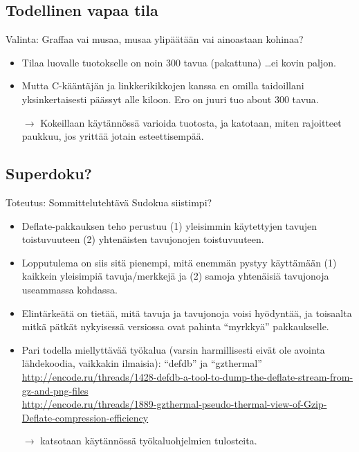 \documentclass[pdf,10pt,handout]{beamer}
\begin{document}
\subsection{Todellinen vapaa tila}
\begin{frame}{Valinta: Graffaa vai musaa, musaa ylipäätään vai ainoastaan kohinaa?}
  \begin{itemize}
  \item Tilaa luovalle tuotokselle on noin 300 tavua (pakattuna)
    \ldots ei kovin paljon.
  \item Mutta C-kääntäjän ja linkkerikikkojen kanssa en omilla
    taidoillani yksinkertaisesti päässyt alle kiloon. Ero on juuri tuo
    about 300 tavua.
    \item[$\rightarrow$] Kokeillaan käytännössä varioida tuotosta, ja
      katotaan, miten rajoitteet paukkuu, jos yrittää jotain
      esteettisempää.
  \end{itemize}
\end{frame}


\subsection{Superdoku?}
\begin{frame}{Toteutus: Sommittelutehtävä Sudokua siistimpi?}
  \begin{itemize}
    \item Deflate-pakkauksen teho perustuu (1) yleisimmin käytettyjen
      tavujen toistuvuuteen (2) yhtenäisten tavujonojen
      toistuvuuteen.
    \item Lopputulema on siis sitä pienempi, mitä enemmän pystyy
      käyttämään (1) kaikkein yleisimpiä tavuja/merkkejä ja (2) samoja
      yhtenäisiä tavujonoja useammassa kohdassa.
    \item Elintärkeätä on tietää, mitä tavuja ja tavujonoja voisi
      hyödyntää, ja toisaalta mitkä pätkät nykyisessä versiossa ovat
      pahinta ``myrkkyä'' pakkaukselle.
    \item Pari todella miellyttävää työkalua (varsin harmillisesti
      eivät ole avointa lähdekoodia, vaikkakin ilmaisia): ``defdb'' ja
      ``gzthermal''\\{\tiny
      \url{http://encode.ru/threads/1428-defdb-a-tool-to-dump-the-deflate-stream-from-gz-and-png-files}\\
      \url{http://encode.ru/threads/1889-gzthermal-pseudo-thermal-view-of-Gzip-Deflate-compression-efficiency}\\}
    \item[$\rightarrow$] katsotaan käytännössä työkaluohjelmien tulosteita.
  \end{itemize}
\end{frame}
\end{document}

